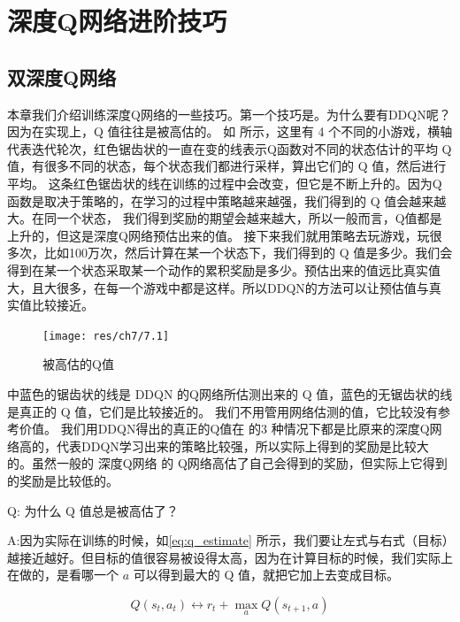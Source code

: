 \section{深度Q网络进阶技巧}

\subsection{双深度Q网络} 
本章我们介绍训练深度Q网络的一些技巧。第一个技巧是。为什么要有DDQN呢？因为在实现上，Q 值往往是被高估的。
如 所示，这里有 4 个不同的小游戏，横轴代表迭代轮次，红色锯齿状的一直在变的线表示Q函数对不同的状态估计的平均 Q 值，有很多不同的状态，每个状态我们都进行采样，算出它们的 Q 值，然后进行平均。
这条红色锯齿状的线在训练的过程中会改变，但它是不断上升的。因为Q函数是取决于策略的，在学习的过程中策略越来越强，我们得到的 Q 值会越来越大。在同一个状态， 我们得到奖励的期望会越来越大，所以一般而言，Q值都是上升的，但这是深度Q网络预估出来的值。
接下来我们就用策略去玩游戏，玩很多次，比如100万次，然后计算在某一个状态下，我们得到的 Q 值是多少。我们会得到在某一个状态采取某一个动作的累积奖励是多少。预估出来的值远比真实值大，且大很多，在每一个游戏中都是这样。所以DDQN的方法可以让预估值与真实值比较接近。
\begin{figure}[htb]
    \centering
    \texttt{[image: res/ch7/7.1]}
    \caption{被高估的Q值}
    \label{fig:q_overestimate}
\end{figure}

 中蓝色的锯齿状的线是 DDQN 的Q网络所估测出来的 Q 值，蓝色的无锯齿状的线是真正的 Q 值，它们是比较接近的。
我们不用管用网络估测的值，它比较没有参考价值。
我们用DDQN得出的真正的Q值在 的3 种情况下都是比原来的深度Q网络高的，代表DDQN学习出来的策略比较强，所以实际上得到的奖励是比较大的。虽然一般的 深度Q网络 的 Q网络高估了自己会得到的奖励，但实际上它得到的奖励是比较低的。

Q: 为什么 Q 值总是被高估了？

A:因为实际在训练的时候，如\eqref{eq:q_estimate} 所示，我们要让左式与右式（目标）越接近越好。但目标的值很容易被设得太高，因为在计算目标的时候，我们实际上在做的，是看哪一个 $a$ 可以得到最大的 Q 值，就把它加上去变成目标。

\begin{equation}
    \label{eq:q_estimate}
    Q\left(s_{t}, a_{t}\right) \longleftrightarrow r_{t}+\max _{a} Q\left(s_{t+1}, a\right)
\end{equation}


